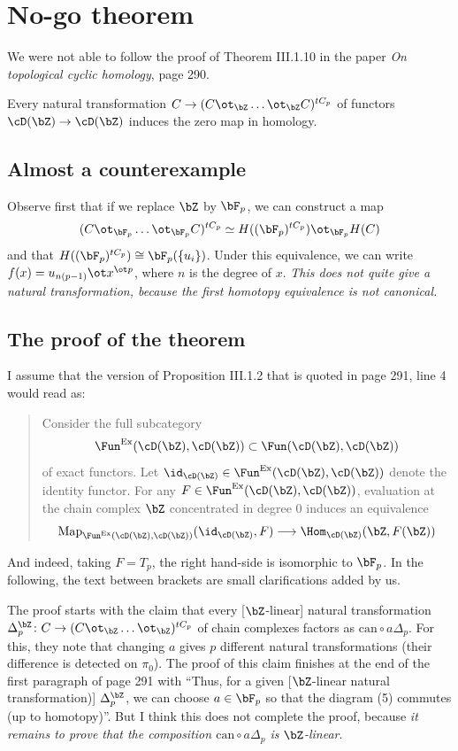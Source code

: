 
\section{No-go theorem}
We were not able to follow the proof of Theorem III.1.10 in the paper \emph{On topological cyclic homology}, page 290.

\begin{theorem*}
	Every natural transformation $C\to (C\ot_{\bZ}\dots \ot_{\bZ} C)^{tC_p}$ of functors $\cD(\bZ)\to \cD(\bZ)$ induces the zero map in homology.
\end{theorem*}
\subsection*{Almost a counterexample} Observe first that if we replace $\bZ$ by $\bF_p$, we can construct a map
\[
	(C\ot_{\bF_p}\dots \ot_{\bF_p} C)^{tC_p}\simeq H((\bF_p)^{tC_p})\ot_{\bF_p} H(C)
\]
and that $H((\bF_p)^{tC_p}) \cong \bF_p(\{u_i\})$. Under this equivalence, we can write $f(x) = u_{n(p-1)}\ot x^{\ot p}$, where $n$ is the degree of $x$. \emph{This does not quite give a natural transformation, because the first homotopy equivalence is not canonical.}

\subsection*{The proof of the theorem}

I assume that the version of Proposition III.1.2 that is quoted in page 291, line 4 would read as:
\begin{quote}
	Consider the full subcategory 
	\[\Fun^{\mathrm{Ex}}(\cD(\bZ),\cD(\bZ))\subset \Fun(\cD(\bZ),\cD(\bZ))
	\] 
	of exact functors. Let $\id_{\cD(\bZ)}\in \Fun^{\mathrm{Ex}}(\cD(\bZ),\cD(\bZ))$ denote the identity functor.	
	For any $F\in \Fun^{\mathrm{Ex}}(\cD(\bZ),\cD(\bZ))$, evaluation at the chain complex $\bZ$ concentrated in degree $0$ induces an equivalence
	\[
		\mathrm{Map}_{\Fun^{\mathrm{Ex}}(\cD(\bZ),\cD(\bZ))}(\id_{\cD(\bZ)}, F)\longrightarrow 
		\Hom_{\cD(\bZ)}(\bZ,F(\bZ))
	\]
\end{quote}
And indeed, taking $F=T_p$, the right hand-side is isomorphic to $\bF_p$. In the following, the text between brackets are small clarifications added by us.

The proof starts with the claim that every [$\bZ$-linear] natural transformation $\Delta_p^{\bZ}\colon C\to (C\ot_{\bZ}\dots \ot_{\bZ})^{tC_p}$ of chain complexes factors as $\mathrm{can}\circ a\Delta_p$. For this, they note that changing $a$ gives $p$ different natural transformations (their difference is detected on $\pi_0$). The proof of this claim finishes at the end of the first paragraph of page 291 with ``Thus, for a given [$\bZ$-linear natural transformation)] $\Delta_p^{\bZ}$, we can choose $a\in \bF_p$ so that the diagram (5) commutes (up to homotopy)''. But I think this does not complete the proof, because \emph{it remains to prove that the composition $\mathrm{can}\circ a\Delta_p$ is $\bZ$-linear}.

